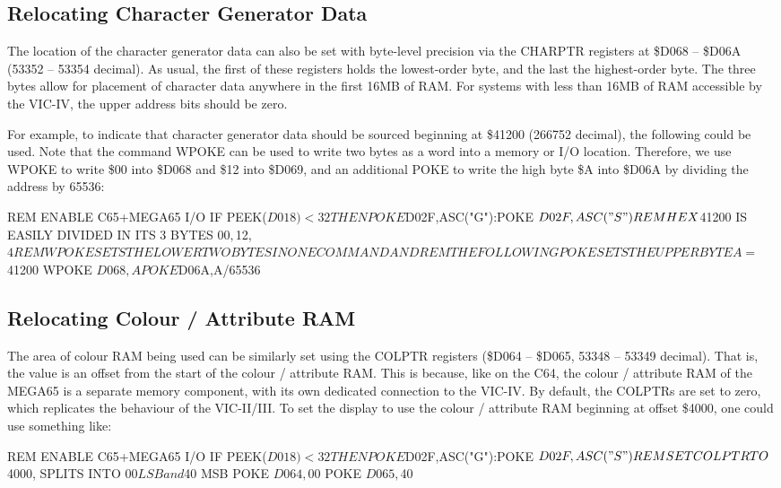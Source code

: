 \subsection{Relocating Character Generator Data}

The location of the character generator data can also be set with byte-level precision via the CHARPTR registers at \$D068 -- \$D06A (53352 -- 53354 decimal). As usual, the first of these registers holds the lowest-order byte, and the last the highest-order byte. The three bytes allow for placement of character data anywhere in the first 16MB of RAM. For systems with less than 16MB of RAM accessible by the VIC-IV, the upper address bits should be zero.

For example, to indicate that character generator data should be sourced beginning at \$41200 (266752 decimal), the following
could be used.  Note that the command WPOKE can be used to write two bytes as a word into a memory or I/O location. Therefore, we use WPOKE to write \$00 into \$D068 and \$12 into \$D069, and an additional POKE to write the high byte \$A into \$D06A by dividing the address by 65536:

\begin{screencode}
REM ENABLE C65+MEGA65 I/O
IF PEEK($D018)<32 THEN POKE $D02F,ASC("G"):POKE $D02F,ASC("S")
REM HEX $41200 IS EASILY DIVIDED IN ITS 3 BYTES $00, $12, $4
REM WPOKE SETS THE LOWER TWO BYTES IN ONE COMMAND AND
REM THE FOLLOWING POKE SETS THE UPPER BYTE
A=$41200
WPOKE $D068,A
POKE $D06A,A/65536
\end{screencode}

\subsection{Relocating Colour / Attribute RAM}

The area of colour RAM being used can be similarly set using the COLPTR registers (\$D064 -- \$D065, 53348 -- 53349 decimal). That is, the value is an offset from the start of the colour / attribute RAM.  This is because, like on the C64, the colour / attribute RAM of the MEGA65 is a separate memory component, with its own dedicated connection to the VIC-IV.  By default, the COLPTRs are set to zero, which replicates the behaviour of the VIC-II/III.  To set the display to use the colour / attribute RAM beginning at offset \$4000, one could use something like:

\begin{screencode}
REM ENABLE C65+MEGA65 I/O
IF PEEK($D018)<32 THEN POKE $D02F,ASC("G"):POKE $D02F,ASC("S")
REM SET COLPTR TO $4000, SPLITS INTO $00 LSB and $40 MSB
POKE $D064,$00
POKE $D065,$40
\end{screencode}

